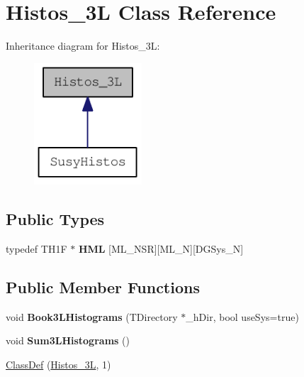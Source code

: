 \hypertarget{classHistos__3L}{
\section{Histos\_\-3L Class Reference}
\label{classHistos__3L}
}
Inheritance diagram for Histos\_\-3L:\nopagebreak
\begin{figure}[H]
\begin{center}
\leavevmode
\includegraphics[width=114pt]{classHistos__3L__inherit__graph}
\end{center}
\end{figure}
\subsection*{Public Types}
\begin{DoxyCompactItemize}
\item 
\hypertarget{classHistos__3L_a952977bc68eea6cfd22880aa36068a45}{
typedef TH1F $\ast$ {\bfseries HML} \mbox{[}ML\_\-NSR\mbox{]}\mbox{[}ML\_\-N\mbox{]}\mbox{[}DGSys\_\-N\mbox{]}}
\label{classHistos__3L_a952977bc68eea6cfd22880aa36068a45}

\end{DoxyCompactItemize}
\subsection*{Public Member Functions}
\begin{DoxyCompactItemize}
\item 
\hypertarget{classHistos__3L_a3831a414422d4088e11530d7719fe71e}{
void {\bfseries Book3LHistograms} (TDirectory $\ast$\_\-hDir, bool useSys=true)}
\label{classHistos__3L_a3831a414422d4088e11530d7719fe71e}

\item 
\hypertarget{classHistos__3L_a759eec3fd0f1d2d70473284fa8b3a4da}{
void {\bfseries Sum3LHistograms} ()}
\label{classHistos__3L_a759eec3fd0f1d2d70473284fa8b3a4da}

\item 
\hyperlink{classHistos__3L_a7d0bc7498db9a0508da4d58188746ae0}{ClassDef} (\hyperlink{classHistos__3L}{Histos\_\-3L}, 1)
\end{DoxyCompactItemize}
